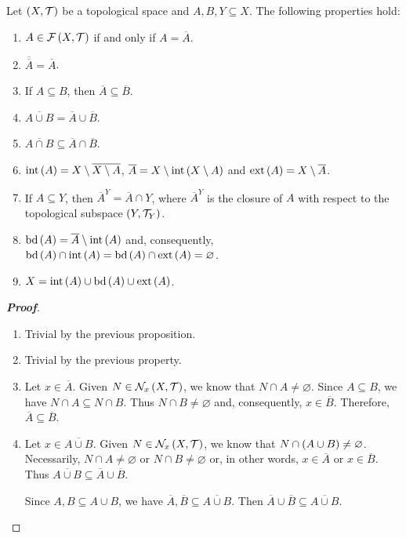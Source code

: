 \begin{proposition}
  Let $\left(X,\mathcal{T}\right)$ be a topological space and $A,B,Y\subseteq X$. The following properties hold:
  \begin{enumerate}
    \item $A\in\mathcal{F}\left(X,\mathcal{T}\right)$ if and only if $A=\overline{A}$.
    \item $\overline{\overline{A}}=\overline{A}$.
    \item If $A\subseteq B$, then $\overline{A}\subseteq\overline{B}$.
    \item $\overline{A\cup B}=\overline{A}\cup\overline{B}$.
    \item $\overline{A\cap B}\subseteq\overline{A}\cap\overline{B}$.
    \item $\operatorname{int}\left(A\right)=X\setminus\overline{X\setminus A}$, $\overline{A}=X\setminus\operatorname{int}\left(X\setminus A\right)$ and $\operatorname{ext}\left(A\right)=X\setminus\overline{A}$.
    \item If $A\subseteq Y$, then $\overline{A}^Y=\overline{A}\cap Y$, where $\overline{A}^Y$ is the closure of $A$ with respect to the topological subspace $\left(Y,\mathcal{T}_Y\right)$.
    \item $\operatorname{bd}\left(A\right)=\overline{A}\setminus\operatorname{int}\left(A\right)$ and, consequently, $\operatorname{bd}\left(A\right)\cap\operatorname{int}\left(A\right)=\operatorname{bd}\left(A\right)\cap\operatorname{ext}\left(A\right)=\varnothing$.
    \item $X=\operatorname{int}\left(A\right)\cup\operatorname{bd}\left(A\right)\cup\operatorname{ext}\left(A\right)$.
  \end{enumerate}
  \begin{proof}[\rm\textbf{Proof}]
    \hfill
    \begin{enumerate}
      \item Trivial by the previous proposition.
      \item Trivial by the previous property.
      \item Let $x\in\overline{A}$. Given $N\in\mathcal{N}_x\left(X,\mathcal{T}\right)$, we know that $N\cap A\neq\varnothing$. Since $A\subseteq B$, we have $N\cap A\subseteq N\cap B$. Thus $N\cap B\neq\varnothing$ and, consequently, $x\in\overline{B}$. Therefore, $\overline{A}\subseteq\overline{B}$.
      \item Let $x\in\overline{A\cup B}$. Given $N\in\mathcal{N}_x\left(X,\mathcal{T}\right)$, we know that $N\cap\left(A\cup B\right)\neq\varnothing$. Necessarily, $N\cap A\neq\varnothing$ or $N\cap B\neq\varnothing$ or, in other words, $x\in\overline{A}$ or $x\in\overline{B}$. Thus $\overline{A\cup B}\subseteq\overline{A}\cup\overline{B}$.
      
      Since $A,B\subseteq A\cup B$, we have $\overline{A},\overline{B}\subseteq\overline{A\cup B}$. Then $\overline{A}\cup\overline{B}\subseteq\overline{A\cup B}$.
      

\end{enumerate}
\end{proof}
\end{proposition}
